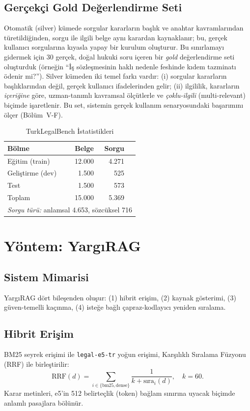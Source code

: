 \documentclass[conference]{IEEEtran}
\begin{document}
\subsection{Gerçekçi Gold Değerlendirme Seti}
Otomatik (silver) kümede sorgular kararların başlık ve anahtar kavramlarından türetildiğinden, sorgu ile ilgili belge aynı karardan kaynaklanır; bu, gerçek kullanıcı sorgularına kıyasla yapay bir kurulum oluşturur. Bu sınırlamayı gidermek için 30 gerçek, doğal hukuki soru içeren bir \emph{gold} değerlendirme seti oluşturduk (örneğin ``İş sözleşmesinin haklı nedenle feshinde kıdem tazminatı ödenir mi?''). Silver kümeden iki temel farkı vardır: (i) sorgular kararların başlıklarından değil, gerçek kullanıcı ifadelerinden gelir; (ii) ilgililik, kararların \emph{içeriğine} göre, uzman-tanımlı kavramsal ölçütlerle ve \emph{çoklu-ilgili} (multi-relevant) biçimde işaretlenir. Bu set, sistemin gerçek kullanım senaryosundaki başarımını ölçer (Bölüm~V-F).

\begin{table}[t]
\caption{TurkLegalBench İstatistikleri}
\label{tab:bench}
\centering
\begin{tabular}{lrrr}
\toprule
Bölme & Belge & Sorgu & \\
\midrule
Eğitim (train) & 12.000 & 4.271 & \\
Geliştirme (dev) & 1.500 & 525 & \\
Test & 1.500 & 573 & \\
\midrule
Toplam & 15.000 & 5.369 & \\
\midrule
\multicolumn{4}{l}{\textit{Sorgu türü:} anlamsal 4.653, sözcüksel 716} \\
\bottomrule
\end{tabular}
\end{table}

\section{Yöntem: YargıRAG}
\subsection{Sistem Mimarisi}
YargıRAG dört bileşenden oluşur: (1) hibrit erişim, (2) kaynak gösterimi, (3) güven-temelli kaçınma, (4) isteğe bağlı çapraz-kodlayıcı yeniden sıralama.

\subsection{Hibrit Erişim}
BM25 seyrek erişimi ile \texttt{legal-e5-tr} yoğun erişimi, Karşılıklı Sıralama Füzyonu (RRF) ile birleştirilir:
\begin{equation}
\text{RRF}(d) = \sum_{i \in \{\text{bm25},\text{dense}\}} \frac{1}{k + \text{sıra}_i(d)}, \quad k=60.
\end{equation}
Karar metinleri, e5'in 512 belirteçlik (token) bağlam sınırına uyacak biçimde anlamlı pasajlara bölünür.
\end{document}
